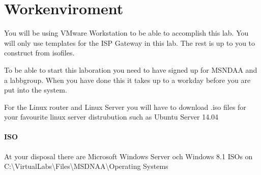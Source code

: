 \documentclass[paper=a4, fontsize=11pt]{report} %
\newcommand{\win}[1]{Microsoft Windows Server\ifthenelse{\isempty{#1}}{}{ #1}}
\begin{document}
\section{Workenviroment}
\label{enviroment}

You will be using VMware Workstation to be able to accomplish this lab. You will only use templates for the ISP Gateway in this lab. The rest is up to you to construct from isofiles.
 
To be able to start this laboration you need to have signed up for MSNDAA and a labbgroup. When you have done this it takes up to a workday before you are put into the system.

For the Linux router and Linux Server you will have to download .iso files for your favourite linux server distrubution such as Ubuntu Server 14.04

\paragraph{ISO} At your disposal there are \win{2012 R2} och Windows 8.1 ISOs on 
C:\textbackslash VirtualLabs\textbackslash Files\textbackslash MSDNAA\textbackslash Operating Systems
\end{document}
